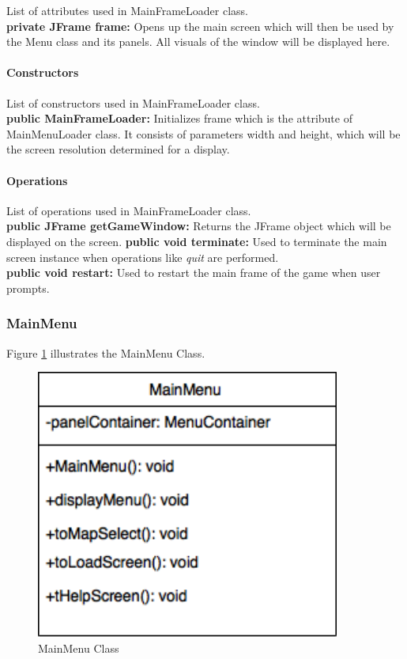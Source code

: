 \documentclass[12pt]{article} %
\begin{document}
List of attributes used in MainFrameLoader class.\\
\textbf{private JFrame frame:} Opens up the main screen which will then be used by the Menu class and its panels.  All visuals of the window will be displayed here.\\

\paragraph{Constructors \\}
List of constructors used in MainFrameLoader class.\\
\textbf{public MainFrameLoader:} Initializes frame which is the attribute of MainMenuLoader class.  It consists of parameters width and height, which will be the screen resolution determined for a display.

\paragraph{Operations \\}
List of operations used in MainFrameLoader class.\\
\textbf{public JFrame getGameWindow:} Returns the JFrame object which will be displayed on the screen.
\textbf{public void terminate:} Used to terminate the main screen instance when operations like \textit{quit} are performed.\\
\textbf{public void restart:} Used to restart the main frame of the game when user prompts.

\subsubsection{MainMenu}

Figure \ref{fig:mainmenu} illustrates the MainMenu Class.
\begin{figure}[h!]
   \centering
   \vspace{10pt}%
   \includegraphics[width=10cm]{mainmenu.png}
   \caption{MainMenu Class}
   \label{fig:mainmenu}
\end{figure}
\end{document}
